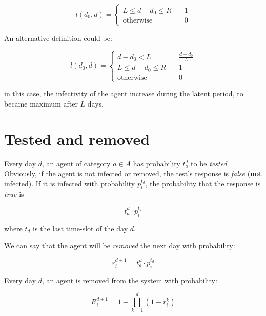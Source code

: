 \documentclass[12pt, a4paper]{article}
\begin{document}
\begin{equation}
     l(d_0, d) = \begin{cases}
            L \leq d-d_0 \leq R     &\quad{} 1 \\
            \text{otherwise} &\quad{} 0
        \end{cases}
\end{equation}

An alternative definition could be:

\begin{equation}
     l(d_0, d) = \begin{cases}
            d-d_0 < L               &\quad{} \frac{d-d_0}{L} \\
            L \leq d-d_0 \leq R     &\quad{} 1 \\
            \text{otherwise}        &\quad{} 0
        \end{cases}
\end{equation}

in this case, the infectivity of the agent increase during the latent period, to became maximum after $L$ days. 


\section{Tested and removed}

Every day $d$, an agent of category $a\in A$ has probability $t_a^d$ to be \textit{tested}. Obviously, if the agent is not infected or removed, the test's response is \textit{false} (\textbf{not} infected). If it is infected with probability $p_i^{t_d}$, the probability that the response is \textit{true} is 

\begin{equation}
     t^d_a\cdot{p_i^{t_d}}    
\end{equation}


where $t_d$ is the last time-slot of the day $d$.

We can say that the agent will be \textit{removed} the next day with probability:

\begin{equation}
     r^{d+1}_i = t^d_a\cdot{p_i^{t_d}}
\end{equation}

Every day $d$, an agent is removed from the system with probability:

\begin{equation}
     R_i^{d+1} = 1 - \prod_{k=1}^{d}(1-r^k_i)
\end{equation}
\end{document}
